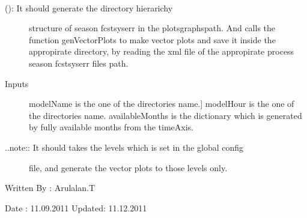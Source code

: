 \documentclass[letterpaper,10pt,english]{sphinxmanual}
\begin{document}
\begin{fulllineitems}
\label{diagnosis:generate_winds_plots.genSeasonFcstSysErrDirs}~\begin{description}
\item[{{\hyperref[diagnosis:generate_winds_plots.genSeasonFcstSysErrDirs]{}} (): It should generate the directory hierarichy}] \leavevmode
structure of season fcstsyserr in the plotsgraphspath. And calls the
function genVectorPlots to make vector plots and save it inside the
appropirate directory, by reading the xml file of the appropirate
process season fcstsyserr files path.

\item[{Inputs}] \leavevmode{[}modelName is the one of the directories name.{]}
modelHour is the one of the directories name.
availableMonths is the dictionary which is generated by fully
available months from the timeAxis.

\item[{..note:: It should takes the levels which is set in the global config}] \leavevmode
file, and generate the vector plots to those levels only.

\end{description}

Written By : Arulalan.T

Date : 11.09.2011
Updated: 11.12.2011

\end{fulllineitems}

\end{document}
